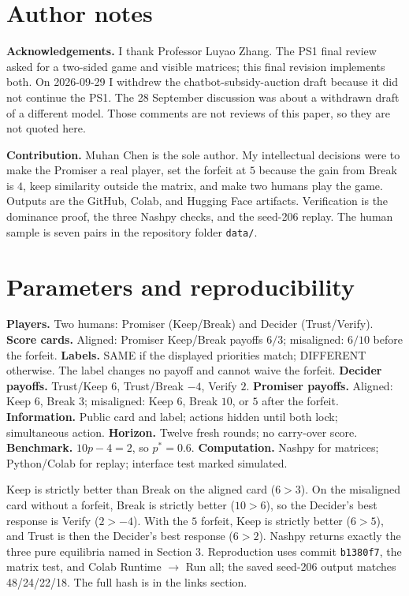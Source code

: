 \clearpage
\appendix
\section{Author notes}
\textbf{Acknowledgements.} I thank Professor Luyao Zhang. The PS1 final review asked for a two-sided game and visible matrices; this final revision implements both. On 2026-09-29 I withdrew the chatbot-subsidy-auction draft because it did not continue the PS1. The 28 September discussion was about a withdrawn draft of a different model. Those comments are not reviews of this paper, so they are not quoted here.

\textbf{Contribution.} Muhan Chen is the sole author. My intellectual decisions were to make the Promiser a real player, set the forfeit at $5$ because the gain from Break is $4$, keep similarity outside the matrix, and make two humans play the game. Outputs are the GitHub, Colab, and Hugging Face artifacts. Verification is the dominance proof, the three Nashpy checks, and the seed-206 replay. The human sample is seven pairs in the repository folder \texttt{data/}.




\section{Parameters and reproducibility}
\textbf{Players.} Two humans: Promiser (Keep/Break) and Decider (Trust/Verify). \textbf{Score cards.} Aligned: Promiser Keep/Break payoffs $6/3$; misaligned: $6/10$ before the forfeit. \textbf{Labels.} SAME if the displayed priorities match; DIFFERENT otherwise. The label changes no payoff and cannot waive the forfeit. \textbf{Decider payoffs.} Trust/Keep $6$, Trust/Break $-4$, Verify $2$. \textbf{Promiser payoffs.} Aligned: Keep $6$, Break $3$; misaligned: Keep $6$, Break $10$, or $5$ after the forfeit. \textbf{Information.} Public card and label; actions hidden until both lock; simultaneous action. \textbf{Horizon.} Twelve fresh rounds; no carry-over score. \textbf{Benchmark.} $10p-4=2$, so $p^\ast=0.6$. \textbf{Computation.} Nashpy for matrices; Python/Colab for replay; interface test marked simulated.

Keep is strictly better than Break on the aligned card ($6>3$). On the misaligned card without a forfeit, Break is strictly better ($10>6$), so the Decider's best response is Verify ($2>-4$). With the $5$ forfeit, Keep is strictly better ($6>5$), and Trust is then the Decider's best response ($6>2$). Nashpy returns exactly the three pure equilibria named in Section 3. Reproduction uses commit \texttt{b1380f7}, the matrix test, and Colab Runtime $\rightarrow$ Run all; the saved seed-206 output matches 48/24/22/18. The full hash is in the links section.


